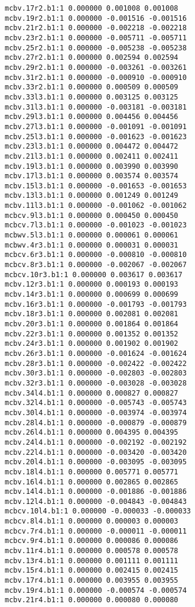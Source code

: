 \begin{verbatim}
mcbv.17r2.b1:1 0.000000 0.001008 0.001008
mcbv.19r2.b1:1 0.000000 -0.001516 -0.001516
mcbv.21r2.b1:1 0.000000 -0.002218 -0.002218
mcbv.23r2.b1:1 0.000000 -0.005711 -0.005711
mcbv.25r2.b1:1 0.000000 -0.005238 -0.005238
mcbv.27r2.b1:1 0.000000 0.002594 0.002594
mcbv.29r2.b1:1 0.000000 -0.003261 -0.003261
mcbv.31r2.b1:1 0.000000 -0.000910 -0.000910
mcbv.33r2.b1:1 0.000000 0.000509 0.000509
mcbv.33l3.b1:1 0.000000 0.003125 0.003125
mcbv.31l3.b1:1 0.000000 -0.003181 -0.003181
mcbv.29l3.b1:1 0.000000 0.004456 0.004456
mcbv.27l3.b1:1 0.000000 -0.001091 -0.001091
mcbv.25l3.b1:1 0.000000 -0.001623 -0.001623
mcbv.23l3.b1:1 0.000000 0.004472 0.004472
mcbv.21l3.b1:1 0.000000 0.002411 0.002411
mcbv.19l3.b1:1 0.000000 0.003990 0.003990
mcbv.17l3.b1:1 0.000000 0.003574 0.003574
mcbv.15l3.b1:1 0.000000 -0.001653 -0.001653
mcbv.13l3.b1:1 0.000000 0.001249 0.001249
mcbv.11l3.b1:1 0.000000 -0.001062 -0.001062
mcbcv.9l3.b1:1 0.000000 0.000450 0.000450
mcbcv.7l3.b1:1 0.000000 -0.001023 -0.001023
mcbwv.5l3.b1:1 0.000000 0.000061 0.000061
mcbwv.4r3.b1:1 0.000000 0.000031 0.000031
mcbcv.6r3.b1:1 0.000000 -0.000810 -0.000810
mcbcv.8r3.b1:1 0.000000 -0.002067 -0.002067
mcbcv.10r3.b1:1 0.000000 0.003617 0.003617
mcbv.12r3.b1:1 0.000000 0.000193 0.000193
mcbv.14r3.b1:1 0.000000 0.000699 0.000699
mcbv.16r3.b1:1 0.000000 -0.001793 -0.001793
mcbv.18r3.b1:1 0.000000 0.002081 0.002081
mcbv.20r3.b1:1 0.000000 0.001864 0.001864
mcbv.22r3.b1:1 0.000000 0.001352 0.001352
mcbv.24r3.b1:1 0.000000 0.001902 0.001902
mcbv.26r3.b1:1 0.000000 -0.001624 -0.001624
mcbv.28r3.b1:1 0.000000 -0.002422 -0.002422
mcbv.30r3.b1:1 0.000000 -0.002803 -0.002803
mcbv.32r3.b1:1 0.000000 -0.003028 -0.003028
mcbv.34l4.b1:1 0.000000 0.000827 0.000827
mcbv.32l4.b1:1 0.000000 -0.005743 -0.005743
mcbv.30l4.b1:1 0.000000 -0.003974 -0.003974
mcbv.28l4.b1:1 0.000000 -0.000879 -0.000879
mcbv.26l4.b1:1 0.000000 0.004395 0.004395
mcbv.24l4.b1:1 0.000000 -0.002192 -0.002192
mcbv.22l4.b1:1 0.000000 -0.003420 -0.003420
mcbv.20l4.b1:1 0.000000 -0.003095 -0.003095
mcbv.18l4.b1:1 0.000000 0.005771 0.005771
mcbv.16l4.b1:1 0.000000 0.002865 0.002865
mcbv.14l4.b1:1 0.000000 -0.001886 -0.001886
mcbv.12l4.b1:1 0.000000 -0.004843 -0.004843
mcbcv.10l4.b1:1 0.000000 -0.000033 -0.000033
mcbcv.8l4.b1:1 0.000000 0.000003 0.000003
mcbcv.7r4.b1:1 0.000000 -0.000011 -0.000011
mcbcv.9r4.b1:1 0.000000 0.000086 0.000086
mcbv.11r4.b1:1 0.000000 0.000578 0.000578
mcbv.13r4.b1:1 0.000000 0.001111 0.001111
mcbv.15r4.b1:1 0.000000 0.002415 0.002415
mcbv.17r4.b1:1 0.000000 0.003955 0.003955
mcbv.19r4.b1:1 0.000000 -0.000574 -0.000574
mcbv.21r4.b1:1 0.000000 0.000080 0.000080

\end{verbatim}
